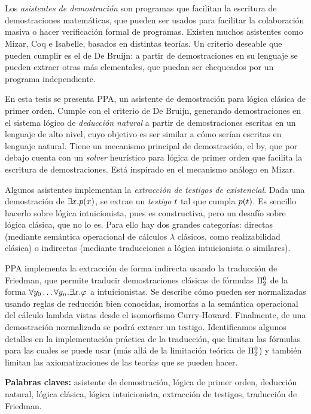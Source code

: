 \chapter*{\runtitulo}

\noindent Los \textit{asistentes de demostración} son programas que facilitan la
escritura de demostraciones matemáticas, que pueden ser usados para
facilitar la colaboración masiva o hacer verificación formal de programas. Existen muchos asistentes como Mizar, Coq e Isabelle, basados en distintas teorías. Un criterio deseable que pueden cumplir es el de De Bruijn: a partir de demostraciones en su lenguaje se pueden extraer otras más elementales, que puedan ser chequeados por un programa independiente.

En esta tesis se presenta PPA, un asistente de demostración para lógica clásica
de primer orden. Cumple con el criterio de De Bruijn, generando
demostraciones en el sistema lógico de \textit{deducción natural} a partir de
demostraciones escritas en un lenguaje de alto nivel, cuyo objetivo es ser
similar a cómo serían escritas en lenguaje natural. Tiene un mecanismo principal
de demostración, el by, que por debajo cuenta con un \textit{solver} heurístico
para lógica de primer orden que facilita la escritura de demostraciones. Está
inspirado en el mecanismo análogo en Mizar.

Algunos asistentes implementan la \textit{extracción de testigos de
existencial}. Dada una demostración de $\exists x . p(x)$, se extrae
un \textit{testigo} $t$ tal que cumpla $p(t)$. Es sencillo hacerlo sobre lógica intuicionista, pues es constructiva, pero un desafío sobre lógica clásica, que no lo es. Para ello hay dos grandes categorías: directas (mediante semántica operacional de cálculos $\lambda$ clásicos, como realizabilidad clásica) o indirectas (mediante traducciones a lógica intuicionista o similares).

PPA implementa la extracción de forma indirecta usando la traducción de
Friedman, que permite traducir demostraciones clásicas de fórmulas $\Pi^0_{2}$
de la forma $\forall y_0 \dots \forall y_n . \exists x .
\varphi$ a intuicionistas. Se describe cómo pueden ser normalizadas usando
reglas de reducción bien conocidas, isomorfas a la semántica operacional del cálculo lambda vistas desde el isomorfismo Curry-Howard. Finalmente, de una demostración normalizada se podrá extraer un testigo.
Identificamos algunos detalles en la implementación práctica de la traducción,
que limitan las fórmulas para las cuales se puede usar (más allá de la
limitación teórica de $\Pi^0_{2}$) y también limitan las axiomatizaciones de
las teorías que se pueden hacer.

\bigskip

\noindent\textbf{Palabras claves:} asistente de demostración, lógica de primer orden, deducción natural, lógica clásica, lógica intuicionista, extracción de testigos, traducción de Friedman.